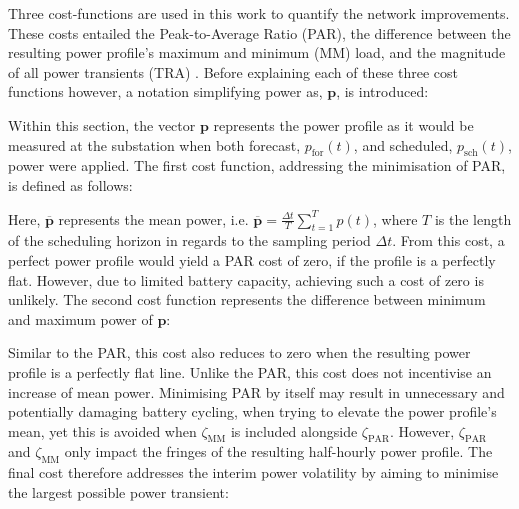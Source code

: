 Three cost-functions are used in this work to quantify the network improvements.
These costs entailed the Peak-to-Average Ratio (PAR), the difference between the resulting power profile's maximum and minimum (MM) load, and the magnitude of all power transients (TRA) \cite{Mohsenian-Rad2010, Mostafa2016}.
Before explaining each of these three cost functions however, a notation simplifying power as, $\textbf{p}$, is introduced:



Within this section, the vector $\textbf{p}$ represents the power profile as it would be measured at the substation when both forecast, $p_\text{for}(t)$, and scheduled, $p_\text{sch}(t)$, power were applied.
The first cost function, addressing the minimisation of PAR, is defined as follows:



Here, $\overline{\textbf{p}}$ represents the mean power, i.e. $\overline{\textbf{p}} = \frac{\Delta t}{T}\sum_{t=1}^Tp(t)$, where $T$ is the length of the scheduling horizon in regards to the sampling period $\Delta t$.
From this cost, a perfect power profile would yield a PAR cost of zero, if the profile is a perfectly flat.
However, due to limited battery capacity, achieving such a cost of zero is unlikely.
The second cost function represents the difference between minimum and maximum power of $\textbf{p}$:



Similar to the PAR, this cost also reduces to zero when the resulting power profile is a perfectly flat line.
Unlike the PAR, this cost does not incentivise an increase of mean power.
Minimising PAR by itself may result in unnecessary and potentially damaging battery cycling, when trying to elevate the power profile's mean, yet this is avoided when $\zeta_\text{MM}$ is included alongside $\zeta_\text{PAR}$.
However, $\zeta_\text{PAR}$ and $\zeta_\text{MM}$ only impact the fringes of the resulting half-hourly power profile.
The final cost therefore addresses the interim power volatility by aiming to minimise the largest possible power transient:


